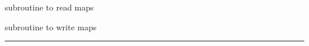\begin{related}
  \begin{sulist}{} %
  \item[\htmlref{read\_healpix\_map}{csub:read_healpix_map}] subroutine to read \healpix maps
  \item[\htmlref{write\_healpix\_map}{csub:write_healpix_map}] subroutine to write \healpix maps
  \end{sulist}
\end{related}

\rule{\hsize}{2mm}

\newpage
